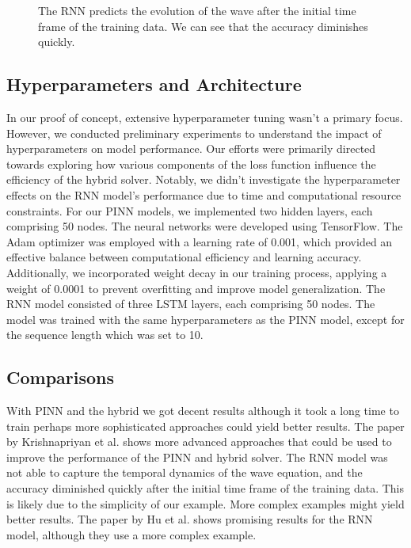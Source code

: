 \documentclass[twoside,11pt]{report}
\begin{document}
\begin{figure}[!ht]
\begin{minipage}[t]{0.5\textwidth - 1mm}
\begin{center}
            \end{center}
            \caption
            {
                The RNN predicts the evolution of the wave after the initial time frame of the training data.
                We can see that the accuracy diminishes quickly.
            }\label{fig:wave_tf_dnn}
        \end{minipage}
    \end{figure}





\subsection{Hyperparameters and Architecture}
\label{sec:hyperparameters}

    In our proof of concept, extensive hyperparameter tuning wasn't a primary focus. 
    However, we conducted preliminary experiments to understand the impact of hyperparameters 
    on model performance. Our efforts were primarily directed towards exploring how various 
    components of the loss function influence the efficiency of the hybrid solver. Notably, 
    we didn't investigate the hyperparameter effects on the RNN model's performance due to time 
    and computational resource constraints.
    For our PINN models, we implemented two hidden layers, each comprising 50 nodes. The neural 
    networks were developed using TensorFlow\cite{tensorflow2015-whitepaper}. The Adam optimizer was 
    employed with a learning 
    rate of 0.001, which provided an effective balance between computational efficiency and learning accuracy. 
    Additionally, we incorporated weight decay in our training process, applying a weight of 0.0001 to prevent 
    overfitting and improve model generalization.
    The RNN model consisted of three LSTM layers, each comprising 50 nodes. The model was trained
    with the same hyperparameters as the PINN model, except for the sequence length which was set to 10.


\subsection{Comparisons}
\label{sec:comparisons}

    With PINN and the hybrid we got decent results although it took a long time to train
    perhaps more sophisticated approaches could yield better results. The paper by 
    Krishnapriyan et al. \cite{krishnapriyan2021characterizing} shows more advanced approaches
    that could be used to improve the performance of the PINN and hybrid solver.
    The RNN model was not able to capture the temporal dynamics of the wave equation, and the accuracy diminished
    quickly after the initial time frame of the training data. This is likely due to the simplicity of our example.
    More complex examples might yield better results. The paper by Hu et al. \cite{hu2022neuralpde} shows promising
    results for the RNN model, although they use a more complex example.
\end{document}
